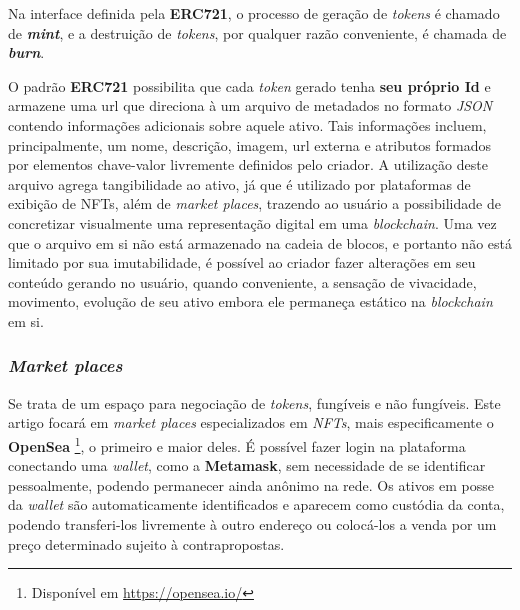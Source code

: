 {Na interface definida pela \textbf{ERC721}, o processo de geração de \textit{tokens} é chamado de \textit{\textbf{mint}}, e a destruição de \textit{tokens}, por qualquer razão conveniente, é chamada de \textit{\textbf{burn}}.

O padrão \textbf{ERC721} possibilita que cada \textit{token} gerado tenha \textbf{seu próprio Id} e armazene uma url que direciona à um arquivo de metadados no formato \textit{JSON} contendo informações adicionais sobre aquele ativo. Tais informações incluem, principalmente, um nome, descrição, imagem, url externa e atributos formados por elementos chave-valor livremente definidos pelo criador. A utilização deste arquivo agrega tangibilidade ao ativo, já que é utilizado por plataformas de exibição de NFTs, além de \textit{market places}, trazendo ao usuário a possibilidade de concretizar visualmente uma representação digital em uma \textit{blockchain}. Uma vez que o arquivo em si não está armazenado na cadeia de blocos, e portanto não está limitado por sua imutabilidade, é possível ao criador fazer alterações em seu conteúdo gerando no usuário, quando conveniente, a sensação de vivacidade, movimento, evolução de seu ativo embora ele permaneça estático na \textit{blockchain} em si.

\subsubsection{\esp \textit{Market places}} \label{marketplace}
Se trata de um espaço para negociação de \textit{tokens}, fungíveis e não fungíveis. Este artigo focará em \textit{market places} especializados em \textit{NFTs}, mais especificamente o \textbf{OpenSea} \footnote{Disponível em \url{https://opensea.io/}}, o primeiro e maior deles. É possível fazer login na plataforma conectando uma \textit{wallet}, como a \textbf{Metamask}, sem necessidade de se identificar pessoalmente, podendo permanecer ainda anônimo na rede. Os ativos em posse da \textit{wallet} são automaticamente identificados e aparecem como custódia da conta, podendo transferi-los livremente à outro endereço ou colocá-los a venda por um preço determinado sujeito à contrapropostas.


}
